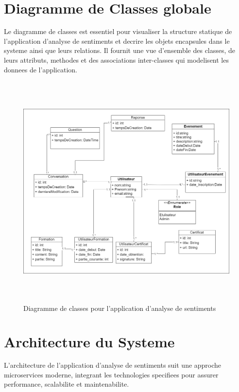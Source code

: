 \section{Diagramme de Classes globale}

Le diagramme de classes est essentiel pour visualiser la structure statique de l'application d'analyse de sentiments et decrire les objets encapsules dans le systeme ainsi que leurs relations. Il fournit une vue d'ensemble des classes, de leurs attributs, methodes et des associations inter-classes qui modelisent les donnees de l'application.

\begin{figure}[H]
\centering
\includegraphics[height=12cm , width=\textwidth]{assets/images/class.png}
\caption{Diagramme de classes pour l'application d'analyse de sentiments}
\label{fig:class-global}
\end{figure}

\section{Architecture du Systeme}

L'architecture de l'application d'analyse de sentiments suit une approche microservices moderne, integrant les technologies specifiees pour assurer performance, scalabilite et maintenabilite.

